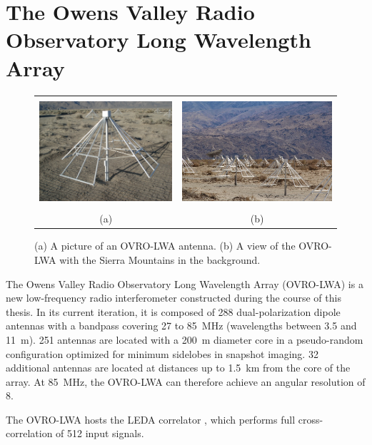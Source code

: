 \chapter{The Owens Valley Radio Observatory Long Wavelength Array}

\begin{bibunit}

\begin{figure}[t]
    \centering
    \begin{tabular}{cc}
        \includegraphics[height=4cm]{figures/chapter2/lwa-antenna} &
        \includegraphics[height=4cm]{figures/chapter2/ovro-lwa} \\
        (a) & (b) \\
    \end{tabular}
    \caption{
        (a) A picture of an OVRO-LWA antenna.
        (b) A view of the OVRO-LWA with the Sierra Mountains in the background.
    }
    \label{fig:ovro-lwa-pictures}
\end{figure}

The Owens Valley Radio Observatory Long Wavelength Array (OVRO-LWA) is a new low-frequency radio
interferometer constructed during the course of this thesis. In its current iteration, it is
composed of 288 dual-polarization dipole antennas with a bandpass covering 27 to 85~MHz (wavelengths
between 3.5 and 11~m). 251 antennas are located with a 200~m diameter core in a pseudo-random
configuration optimized for minimum sidelobes in snapshot imaging. 32 additional antennas are
located at distances up to 1.5~km from the core of the array. At 85~MHz, the OVRO-LWA can therefore
achieve an angular resolution of 8\arcmin.

The OVRO-LWA hosts the LEDA correlator \citep{2015JAI.....450003K}, which performs full
cross-correlation of 512 input signals.



\end{bibunit}
